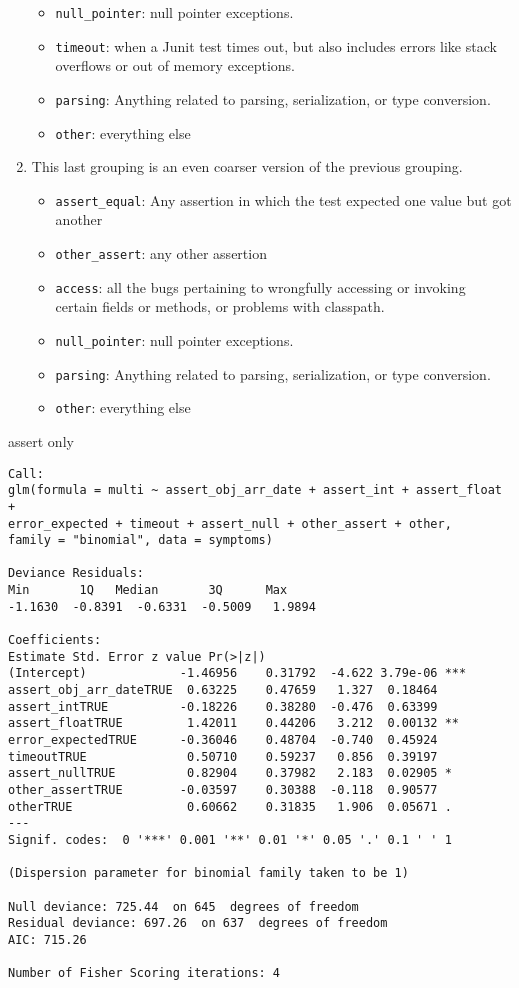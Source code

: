 \begin{enumerate}
\begin{itemize}
		\item \lstinline{null_pointer}: null pointer exceptions.
		\item \lstinline{timeout}: when a Junit test times out, but also includes errors like stack overflows or out of memory exceptions.
		\item \lstinline{parsing}: Anything related to parsing, serialization, or type conversion.
		\item \lstinline{other}: everything else
	\end{itemize}
	\item This last grouping is an even coarser version of the previous grouping.
	\begin{itemize}
		\item \lstinline{assert_equal}: Any assertion in which the test expected one value but got another
		\item \lstinline{other_assert}: any other assertion
		\item \lstinline{access}: all the bugs pertaining to wrongfully accessing or invoking certain fields or methods, or problems with classpath.
		\item \lstinline{null_pointer}: null pointer exceptions.
		\item \lstinline{parsing}: Anything related to parsing, serialization, or type conversion.
		\item \lstinline{other}: everything else
	\end{itemize}
\end{enumerate}


assert only
\begin{lstlisting}[basicstyle=\tiny]
Call:
glm(formula = multi ~ assert_obj_arr_date + assert_int + assert_float +
error_expected + timeout + assert_null + other_assert + other,
family = "binomial", data = symptoms)

Deviance Residuals:
Min       1Q   Median       3Q      Max
-1.1630  -0.8391  -0.6331  -0.5009   1.9894

Coefficients:
Estimate Std. Error z value Pr(>|z|)
(Intercept)             -1.46956    0.31792  -4.622 3.79e-06 ***
assert_obj_arr_dateTRUE  0.63225    0.47659   1.327  0.18464
assert_intTRUE          -0.18226    0.38280  -0.476  0.63399
assert_floatTRUE         1.42011    0.44206   3.212  0.00132 **
error_expectedTRUE      -0.36046    0.48704  -0.740  0.45924
timeoutTRUE              0.50710    0.59237   0.856  0.39197
assert_nullTRUE          0.82904    0.37982   2.183  0.02905 *
other_assertTRUE        -0.03597    0.30388  -0.118  0.90577
otherTRUE                0.60662    0.31835   1.906  0.05671 .
---
Signif. codes:  0 '***' 0.001 '**' 0.01 '*' 0.05 '.' 0.1 ' ' 1

(Dispersion parameter for binomial family taken to be 1)

Null deviance: 725.44  on 645  degrees of freedom
Residual deviance: 697.26  on 637  degrees of freedom
AIC: 715.26

Number of Fisher Scoring iterations: 4
\end{lstlisting}

